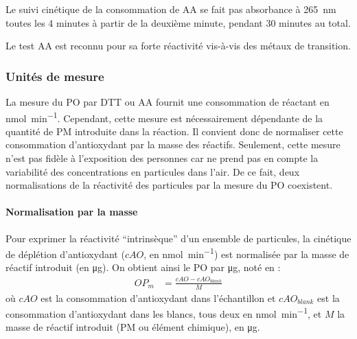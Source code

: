 Le suivi cinétique de la consommation de AA se fait pas absorbance à \SI{265}{\nano\m}
toutes les 4 minutes à partir de la deuxième minute, pendant 30 minutes au total.

Le test AA est reconnu pour sa forte réactivité vis-à-vis des métaux de transition. 


%
%
%

\subsubsection{Unités de mesure}%
\label{ssub:unitees_de_mesures}

La mesure du PO par DTT ou AA fournit une consommation de réactant en \si{\nmol\per\minute}.
Cependant, cette mesure est nécessairement dépendante de la quantité de PM introduite dans
la réaction.
Il convient donc de normaliser cette consommation d'antioxydant par la masse des réactifs.
Seulement, cette mesure n'est pas fidèle à l'exposition des personnes car ne prend pas en
compte la variabilité des concentrations en particules dans l'air. De ce fait, deux normalisations de la réactivité des
particules par la mesure du PO coexistent.

\paragraph{Normalisation par la masse}%
\label{par:normalisation_par_la_masse}
Pour exprimer la réactivité ``intrinsèque'' d'un ensemble de particules, la cinétique de déplétion
d'antioxydant ($cAO$, en \si{\nmol\per\minute}) est normalisée par la masse de réactif
introduit (en \si{\ug}). On obtient ainsi le PO par \si{\ug}, noté \OPm{} en
\si{\opm}:
\begin{align}
    \label{eq:opm}
    OP_m &= \frac{cAO - cAO_{blank}}{M}
\end{align}
où $cAO$ est la consommation d'antioxydant dans l'échantillon et $cAO_{blank}$
est la consommation d'antioxydant dans les blancs, tous deux en \si{\nmol\per\minute}, et $M$
la masse de réactif introduit (PM ou élément chimique), en \si{\ug}.

